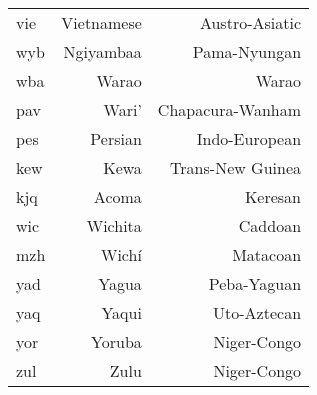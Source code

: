 \begin{longtable}{|l|r|r|}
vie                & Vietnamese                & Austro-Asiatic       \\
wyb                & Ngiyambaa                 & Pama-Nyungan         \\
wba                & Warao                     & Warao                \\
pav                & Wari'                     & Chapacura-Wanham     \\
pes                & Persian                   & Indo-European        \\
kew                & Kewa                      & Trans-New Guinea     \\
kjq                & Acoma                     & Keresan              \\
wic                & Wichita                   & Caddoan              \\
mzh                & Wichí                     & Matacoan             \\
yad                & Yagua                     & Peba-Yaguan          \\
yaq                & Yaqui                     & Uto-Aztecan          \\
yor                & Yoruba                    & Niger-Congo          \\
zul                & Zulu                      & Niger-Congo          
\label{tab:100LC}
\end{longtable}


